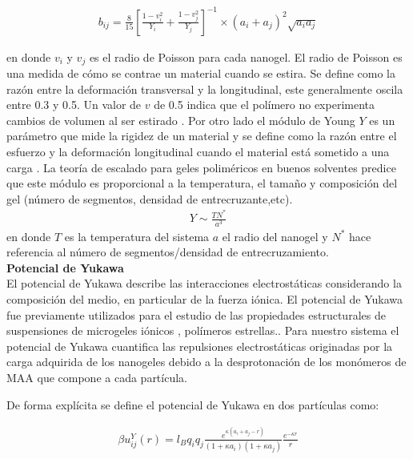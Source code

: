 	\begin{align}
		b_{ij} = \frac{8}{15}\left[\frac{1-v_i^2}{Y_i} + \frac{1-v_j^2}{Y_j}  \right]^{-1} \times(a_i +a_j)^2 \sqrt{a_ia_j}
		\label{eq:mc:bij_param}
	\end{align}
	
	\noindent en donde $v_i$ y $v_j$ es el radio de Poisson para cada nanogel.
	El radio de Poisson es una medida de c\'omo se contrae un material cuando se estira. Se define como la raz\'on entre la deformaci\'on transversal y la longitudinal, este generalmente oscila entre 0.3 y 0.5. Un valor de $v$ de 0.5 indica que el pol\'imero no experimenta cambios de volumen al ser estirado \cite{bertoldi2010negative}.
	Por otro lado el m\'odulo de  Young $Y$  es un par\'ametro  que mide la rigidez de un material y se define como la raz\'on entre el esfuerzo y la deformaci\'on longitudinal cuando el material est\'a sometido a una carga \cite{ku2011review}.
	La teor\'ia de escalado para geles polim\'ericos en buenos solventes \cite{de1979scaling,hu2012polymer} predice que este m\'odulo es proporcional a la temperatura, el tama\~no y composici\'on del gel (n\'umero de segmentos, densidad de entrecruzante,etc).
	\begin{align}
		Y \sim \frac{TN^*}{a^3}
	\end{align}
	\noindent en donde $T$ es la temperatura del sistema $a$ el radio del nanogel y $N^*$ hace referencia al n\'umero de segmentos/densidad de entrecruzamiento. \\
	
	
	\textbf{Potencial de Yukawa} \\
	
	El potencial de Yukawa describe las interacciones electrost\'aticas considerando la composici\'on del medio, en particular de la fuerza i\'onica.
	El potencial de Yukawa fue previamente utilizados para el estudio de las propiedades estructurales de suspensiones de microgeles i\'onicos \citet{weyer2018concentration}, pol\'imeros estrellas.\cite{denton2003counterion}. Para nuestro sistema el potencial de Yukawa cuantifica las repulsiones electrost\'aticas originadas por la carga adquirida de los nanogeles debido a la desprotonaci\'on  de los mon\'omeros de MAA que compone a cada part\'icula.

	
	De forma expl\'icita se define el potencial de Yukawa en dos part\'iculas como: 
	
	\begin{align}
		\beta u^Y_{ij}(r) = l_Bq_i q_j \frac{e^{\kappa(a_i + a_j -r)}}{(1 +\kappa a_i)(1 + \kappa a_j)} \frac{e^{-\kappa r}}{r} 
		\label{eq:mc:yukawa}
	\end{align}
	
